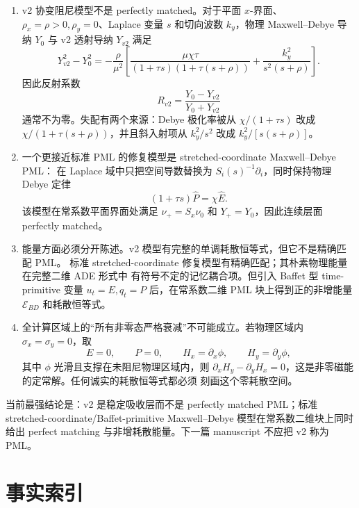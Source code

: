 \documentclass[UTF8,a4paper,11pt]{ctexart}
\newcommand{\sx}{\sigma_x}
\newcommand{\sy}{\sigma_y}
\newcommand{\Ecal}{\mathcal E}
\begin{document}
\begin{enumerate}
\item v2 协变阻尼模型不是 perfectly matched。对于平面 \(x\)-界面、
\(\rho_x=\rho>0,\rho_y=0\)、Laplace 变量 \(s\) 和切向波数 \(k_y\)，物理
Maxwell--Debye 导纳 \(Y_0\) 与 v2 透射导纳 \(Y_{v2}\) 满足
\[
Y_{v2}^2-Y_0^2
=-\frac{\rho}{\mu^2}\left[
\frac{\mu\chi\tau}{(1+\tau s)(1+\tau(s+\rho))}
+\frac{k_y^2}{s^2(s+\rho)}
\right].
\]
因此反射系数
\[
R_{v2}=\frac{Y_0-Y_{v2}}{Y_0+Y_{v2}}
\]
通常不为零。失配有两个来源：Debye 极化率被从
\(\chi/(1+\tau s)\) 改成 \(\chi/(1+\tau(s+\rho))\)，并且斜入射项从
\(k_y^2/s^2\) 改成 \(k_y^2/[s(s+\rho)]\)。

\item 一个更接近标准 PML 的修复模型是 stretched-coordinate Maxwell--Debye PML：
在 Laplace 域中只把空间导数替换为 \(S_i(s)^{-1}\partial_i\)，同时保持物理 Debye
定律
\[
(1+\tau s)\widehat P=\chi\widehat E.
\]
该模型在常系数平面界面处满足 \(\nu_+=S_x\nu_0\) 和 \(Y_+=Y_0\)，因此连续层面
perfectly matched。

\item 能量方面必须分开陈述。v2 模型有完整的单调耗散恒等式，但它不是精确匹配 PML。
标准 stretched-coordinate 修复模型有精确匹配；其朴素物理能量在完整二维 ADE 形式中
有符号不定的记忆耦合项。但引入 Baffet 型 time-primitive 变量 \(u_t=E,q_t=P\)
后，在常系数二维 PML 块上得到正的非增能量 \(\Ecal_{BD}\) 和耗散恒等式。

\item 全计算区域上的“所有非零态严格衰减”不可能成立。若物理区域内
\(\sx=\sy=0\)，取
\[
E=0,\qquad P=0,\qquad H_x=\partial_x\phi,\qquad H_y=\partial_y\phi,
\]
其中 \(\phi\) 光滑且支撑在未阻尼物理区域内，则
\(\partial_xH_y-\partial_yH_x=0\)，这是非零磁能的定常解。任何诚实的耗散恒等式都必须
刻画这个零耗散空间。
\end{enumerate}

当前最强结论是：v2 是稳定吸收层而不是 perfectly matched PML；标准
stretched-coordinate/Baffet-primitive Maxwell--Debye 模型在常系数二维块上同时给出
perfect matching 与非增耗散能量。下一篇 manuscript 不应把 v2 称为 PML。

\section{事实索引}
\end{document}
